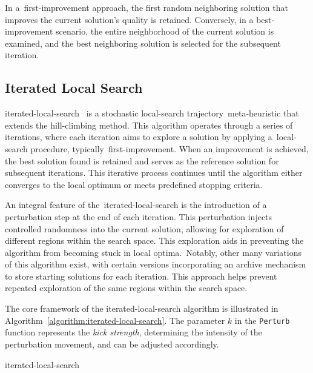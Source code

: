 In a~\acrshort{first-improvement} approach, the first random neighboring solution that
improves the current solution's quality is retained. Conversely, in a
\acrshort{best-improvement} scenario, the entire neighborhood of the current
solution is examined, and the best neighboring solution is selected for the
subsequent iteration.

\subsection{Iterated Local Search}
\label{subsec:iterated-local-search}

\acrfull{iterated-local-search}~\cite{lourenco2010iterateda,luke2013essentialsa,blum2003metaheuristics}
is a stochastic \acrshort{local-search} trajectory~\acrshort{meta-heuristic} that
extends the \acrshort{hill-climbing} method. This algorithm operates through a
series of iterations, where each iteration aims to explore a solution by
applying a~\acrshort{local-search} procedure,
typically~\acrshort{first-improvement}. When an improvement is achieved, the
best solution found is retained and serves as the reference solution for
subsequent iterations. This iterative process continues until the algorithm
either converges to the local optimum or meets predefined stopping criteria.

An integral feature of the~\acrshort{iterated-local-search} is the introduction
of a perturbation step at the end of each iteration. This perturbation injects
controlled randomness into the current solution, allowing for exploration of
different regions within the search space. This exploration aids in preventing
the algorithm from becoming stuck in local optima.~Notably, other many
variations of this algorithm exist, with certain versions incorporating an
archive mechanism to store starting solutions for each iteration. This approach
helps prevent repeated exploration of the same regions within the search space.

The core framework of the \acrshort{iterated-local-search} algorithm is
illustrated in Algorithm~\ref{algorithm:iterated-local-search}. The parameter
$k$ in the \texttt{Perturb} function represents the \textit{kick strength},
determining the intensity of the perturbation movement, and can be
adjusted accordingly.

\begin{algorithm}
  
  \caption{\acrlong{iterated-local-search}}
  \label{algorithm:iterated-local-search}
\end{algorithm}

